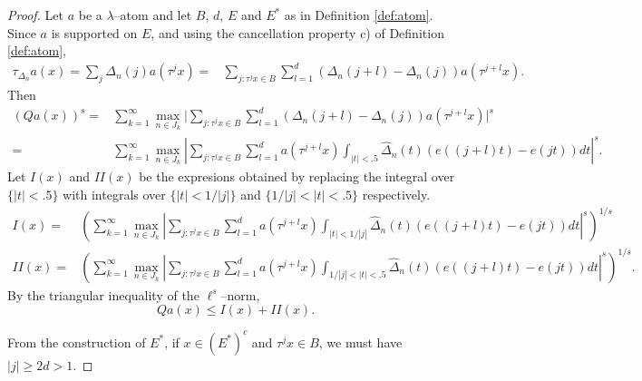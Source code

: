 \documentclass[11pt]{amsart}
\theoremstyle{definition}
\theoremstyle{remark}
\begin{document}
\begin{proof}
Let $a$ be a $\lambda$--atom and let $B$, $d$, $E$ and $E^*$ as in Definition \ref{def:atom}.
Since $a$ is supported on $E$, and using the cancellation property c) of  Definition \ref{def:atom},
\begin{align*}\tau_{\Delta_n} a(x)=\sum_{j} \Delta_n(j) a(\tau^j x) = &
\sum_{j: \tau^jx\in B} \sum_{l=1}^{d} (\Delta_n(j+l) - \Delta_n(j)) a(\tau^{j+l} x).
\end{align*}
%
Then
\begin{align*}
(Q a(x))^s  =& 
\sum_{k=1}^{\infty} \max_{n\in J_k} \Big|
\sum_{j: \tau^jx\in B} \sum_{l=1}^{d} (\Delta_n(j+l) - \Delta_n(j)) a(\tau^{j+l} x)\Big|^s\\
=  & \sum_{k=1}^{\infty} \max_{n\in J_k} \left| \sum_{j: \tau^jx\in B} \sum_{l=1}^{d}a(\tau^{j+l}x) 
\int_{|t|<.5} 
\hat\Delta_n(t) (e((j+l)t)- e(jt) ) dt  \right|^s. 
\end{align*}
Let $I(x)$ and $II(x)$ be the expresions obtained by replacing the integral over $\{|t|<.5\}$ with integrals over  $\{|t|<1/|j|\}$ and $\{1/|j|<|t|<.5\}$ respectively. 
\begin{align*}
I(x)= & \left(\sum_{k=1}^{\infty} \max_{n\in J_k}
\left| \sum_{j: \tau^jx\in B} \sum_{l=1}^{d}a(\tau^{j+l}x)
\int_{|t|<1/|j|} 
\hat\Delta_n(t) (e((j+l)t)- e(jt) ) dt  \right|^s \right)^{1/s} \\
II(x)= & \left(\sum_{k=1}^{\infty} \max_{n\in J_k}
\left| \sum_{j: \tau^jx\in B} \sum_{l=1}^{d}a(\tau^{j+l}x)
\int_{1/|j|<|t|<.5} 
\hat\Delta_n(t) (e((j+l)t)- e(jt) ) dt  \right|^s \right)^{1/s}.
\end{align*}
By the triangular inequality of the $\ell^s$--norm,
\[Q a(x)\le  I(x)+II(x).\]

From the construction of $E^*$, if $x\in (E^*)^c$ %
 and $\tau^jx\in B$, we must have $|j|\ge 2d>1$.


\end{proof}
\end{document}

